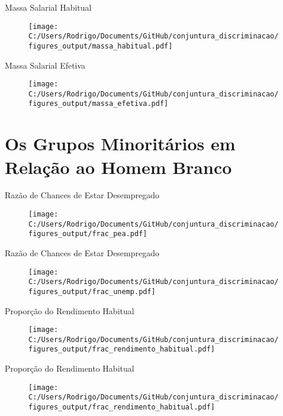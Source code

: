 \documentclass[10pt, xcolor=x11names,compress]{beamer}
\begin{document}
	\begin{frame}{Massa Salarial Habitual}
		\begin{figure}
			\centering
			\texttt{[image: C:/Users/Rodrigo/Documents/GitHub/conjuntura\_discriminacao/figures\_output/massa\_habitual.pdf]}
		\end{figure}
	\end{frame}
	
	\begin{frame}{Massa Salarial Efetiva}
		\begin{figure}
			\centering
			\texttt{[image: C:/Users/Rodrigo/Documents/GitHub/conjuntura\_discriminacao/figures\_output/massa\_efetiva.pdf]}
		\end{figure}
	\end{frame}
	
	
	\section{Os Grupos Minoritários em Relação ao Homem Branco} 
	\begin{frame}{Razão de Chances de Estar Desempregado}
		\begin{figure}
			\centering
			\texttt{[image: C:/Users/Rodrigo/Documents/GitHub/conjuntura\_discriminacao/figures\_output/frac\_pea.pdf]}
		\end{figure}
	\end{frame}
	
	\begin{frame}{Razão de Chances de Estar Desempregado}
		\begin{figure}
			\centering
			\texttt{[image: C:/Users/Rodrigo/Documents/GitHub/conjuntura\_discriminacao/figures\_output/frac\_unemp.pdf]}
		\end{figure}
	\end{frame}
	
	\begin{frame}{Proporção do Rendimento Habitual}
		\begin{figure}
			\centering
			\texttt{[image: C:/Users/Rodrigo/Documents/GitHub/conjuntura\_discriminacao/figures\_output/frac\_rendimento\_habitual.pdf]}
		\end{figure}
	\end{frame}
	
	\begin{frame}{Proporção do Rendimento Habitual}
		\begin{figure}
			\centering
			\texttt{[image: C:/Users/Rodrigo/Documents/GitHub/conjuntura\_discriminacao/figures\_output/frac\_rendimento\_habitual.pdf]}
		\end{figure}
	\end{frame}
	
\end{document}
